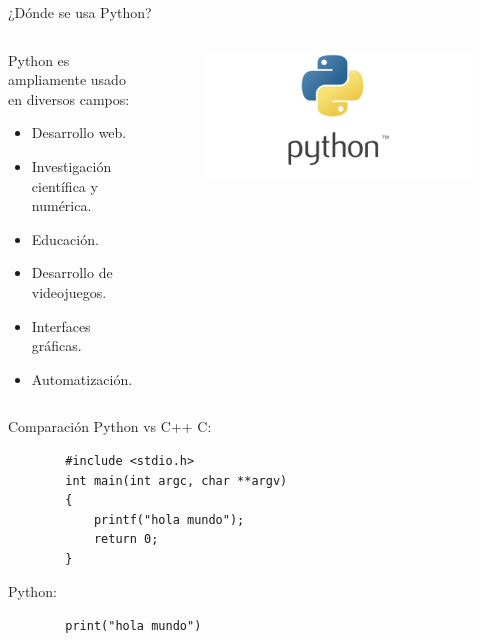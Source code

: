\documentclass[10pt]{beamer}
\begin{document}
\begin{frame}{¿Dónde se usa Python?}
    \begin{columns}
        \begin{column}{0.6\textwidth}
            Python es ampliamente usado en diversos campos:
            \begin{itemize}
                \item Desarrollo web.
                \item Investigación científica y numérica.
                \item Educación.
                \item Desarrollo de videojuegos.
                \item Interfaces gráficas.
                \item Automatización.
            \end{itemize}
        \end{column}
        \begin{column}{0.4\textwidth}
            \begin{figure}[!h] 
                \centering
                \includegraphics[width=1.35\textwidth]{img/logo2}
            \end{figure}
        \end{column}
    \end{columns}
    
\end{frame}
\begin{frame}[fragile]{Comparación Python vs C++}
    C:
    \begin{lstlisting}
        #include <stdio.h>
        int main(int argc, char **argv)
        {
            printf("hola mundo");
            return 0;
        }
    \end{lstlisting}
    Python:
    \begin{lstlisting}
        print("hola mundo")
    \end{lstlisting}
\end{frame}
\end{document}
